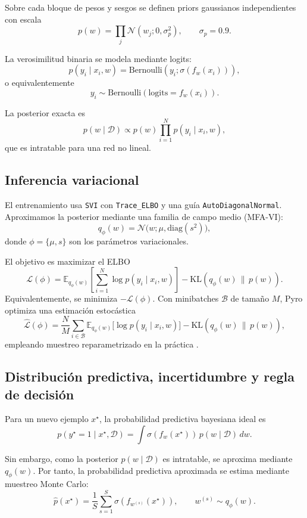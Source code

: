 \documentclass{article}
\begin{document}
Sobre cada bloque de pesos y sesgos se definen priors gaussianos independientes con escala
\[
    p(w)=\prod_j \mathcal{N}(w_j;0,\sigma_p^2),\qquad \sigma_p=0.9.
\]

La verosimilitud binaria se modela mediante logits:
\[
    p(y_i\mid x_i,w)=\mathrm{Bernoulli}\!\left(y_i;\sigma(f_w(x_i))\right),
\]
o equivalentemente
\[
    y_i \sim \mathrm{Bernoulli}\!\left(\text{logits}=f_w(x_i)\right).
\]

La posterior exacta es
\[
    p(w\mid \mathcal{D}) \propto p(w)\prod_{i=1}^{N}p(y_i\mid x_i,w),
\]
que es intratable para una red no lineal.

\subsection{Inferencia variacional}

El entrenamiento usa \texttt{SVI} con \texttt{Trace\_ELBO} y una guía \texttt{AutoDiagonalNormal}. Aproximamos la posterior mediante una familia de campo medio (MFA-VI):
\[
    q_{\phi}(w)=\mathcal{N}\!\bigl(w;\mu,\mathrm{diag}(s^2)\bigr),
\]
donde $\phi=\{\mu,s\}$ son los parámetros variacionales.

El objetivo es maximizar el ELBO
\[
    \mathcal{L}(\phi)
    =
    \mathbb{E}_{q_{\phi}(w)}
    \left[
        \sum_{i=1}^{N}\log p(y_i\mid x_i,w)
        \right]
    -
    \mathrm{KL}\!\left(q_{\phi}(w)\,\|\,p(w)\right).
\]
Equivalentemente, se minimiza $-\mathcal{L}(\phi)$. Con minibatches $\mathcal{B}$ de tamaño $M$, Pyro optimiza una estimación estocástica
\[
    \widehat{\mathcal{L}}(\phi)=
    \frac{N}{M}\sum_{i\in\mathcal{B}}
    \mathbb{E}_{q_{\phi}(w)}\big[\log p(y_i\mid x_i,w)\big]
    -
    \mathrm{KL}\!\left(q_{\phi}(w)\,\|\,p(w)\right),
\]
empleando muestreo reparametrizado en la práctica \citep{kingma2014,blundell2015}.

\subsection{Distribución predictiva, incertidumbre y regla de decisión}

Para un nuevo ejemplo $x^\star$, la probabilidad predictiva bayesiana ideal es
\[
    p(y^\star=1\mid x^\star,\mathcal{D})
    =
    \int \sigma(f_w(x^\star))\,p(w\mid\mathcal{D})\,dw.
\]

Sin embargo, como la posterior $p(w\mid\mathcal{D})$ es intratable, se aproxima mediante $q_{\phi}(w)$. Por tanto, la probabilidad predictiva aproximada se estima mediante muestreo Monte Carlo:
\[
    \hat{p}(x^\star)=
    \frac{1}{S}\sum_{s=1}^{S}\sigma\!\left(f_{w^{(s)}}(x^\star)\right),
    \qquad
    w^{(s)}\sim q_{\phi}(w).
\]
\end{document}
